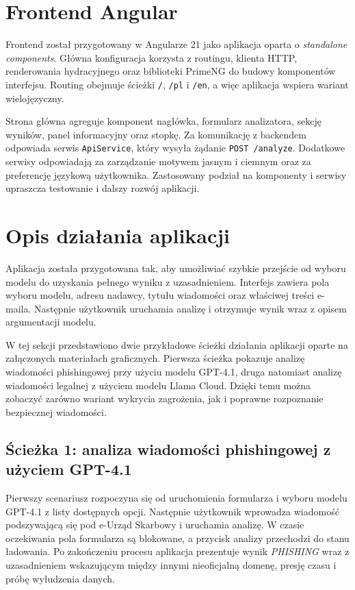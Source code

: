 \documentclass[12pt,a4paper,openright]{report}
\begin{document}
\section{Frontend Angular}

Frontend został przygotowany w Angularze 21 jako aplikacja oparta o \textit{standalone components}. Główna konfiguracja korzysta z routingu, klienta HTTP, renderowania hydracyjnego oraz biblioteki PrimeNG do budowy komponentów interfejsu. Routing obejmuje ścieżki \texttt{/}, \texttt{/pl} i \texttt{/en}, a więc aplikacja wspiera wariant wielojęzyczny.

Strona główna agreguje komponent nagłówka, formularz analizatora, sekcję wyników, panel informacyjny oraz stopkę. Za komunikację z backendem odpowiada serwis \texttt{ApiService}, który wysyła żądanie \texttt{POST /analyze}. Dodatkowe serwisy odpowiadają za zarządzanie motywem jasnym i ciemnym oraz za preferencję językową użytkownika. Zastosowany podział na komponenty i serwisy upraszcza testowanie i dalszy rozwój aplikacji.

\section{Opis działania aplikacji}

Aplikacja została przygotowana tak, aby umożliwiać szybkie przejście od wyboru modelu do uzyskania pełnego wyniku z uzasadnieniem. Interfejs zawiera pola wyboru modelu, adresu nadawcy, tytułu wiadomości oraz właściwej treści e-maila. Następnie użytkownik uruchamia analizę i otrzymuje wynik wraz z opisem argumentacji modelu.

W tej sekcji przedstawiono dwie przykładowe ścieżki działania aplikacji oparte na załączonych materiałach graficznych. Pierwsza ścieżka pokazuje analizę wiadomości phishingowej przy użyciu modelu GPT-4.1, druga natomiast analizę wiadomości legalnej z użyciem modelu Llama Cloud. Dzięki temu można zobaczyć zarówno wariant wykrycia zagrożenia, jak i poprawne rozpoznanie bezpiecznej wiadomości.

\subsection{Ścieżka 1: analiza wiadomości phishingowej z użyciem GPT-4.1}

Pierwszy scenariusz rozpoczyna się od uruchomienia formularza i wyboru modelu GPT-4.1 z listy dostępnych opcji. Następnie użytkownik wprowadza wiadomość podszywającą się pod e-Urząd Skarbowy i uruchamia analizę. W czasie oczekiwania pola formularza są blokowane, a przycisk analizy przechodzi do stanu ładowania. Po zakończeniu procesu aplikacja prezentuje wynik \textit{PHISHING} wraz z uzasadnieniem wskazującym między innymi nieoficjalną domenę, presję czasu i próbę wyłudzenia danych.
\end{document}
